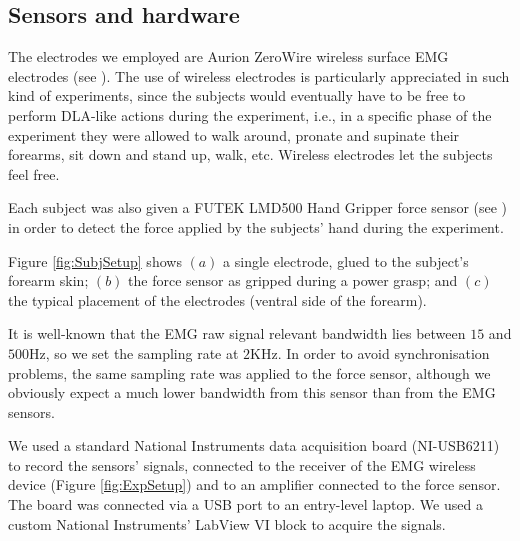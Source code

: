 \documentclass[10pt]{bmc_article}
\newenvironment{bmcformat}{\begin{raggedright}\baselineskip20pt\sloppy\setboolean{publ}{false}}{\end{raggedright}\baselineskip20pt\sloppy}
\begin{document}
\begin{bmcformat}
\subsection*{Sensors and hardware}


The electrodes we employed are Aurion ZeroWire wireless surface EMG
electrodes (see \cite{zerowire}). The use of wireless electrodes is
particularly appreciated in such kind of experiments, since the
subjects would eventually have to be free to perform DLA-like actions
during the experiment, i.e., in a specific phase of the experiment
they were allowed to walk around, pronate and supinate their forearms,
sit down and stand up, walk, etc. Wireless electrodes let the subjects
feel free.

Each subject was also given a FUTEK LMD500 Hand Gripper force sensor
(see \cite{LMD500}) in order to detect the force applied by the subjects'
hand during the experiment.

Figure \ref{fig:SubjSetup} shows $(a)$ a single electrode, glued to
the subject's forearm skin; $(b)$ the force sensor as gripped during a
power grasp; and $(c)$ the typical placement of the electrodes
(ventral side of the forearm).

It is well-known that the EMG raw signal relevant bandwidth lies
between $15$ and $500$Hz, so we set the sampling rate at $2$KHz. In
order to avoid synchronisation problems, the same sampling rate was
applied to the force sensor, although we obviously expect a much lower
bandwidth from this sensor than from the EMG sensors.

We used a standard National Instruments data acquisition board
(NI-USB6211) to record the sensors' signals, connected to the receiver
of the EMG wireless device (Figure \ref{fig:ExpSetup}) and to an
amplifier connected to the force sensor. The board was connected via a
USB port to an entry-level laptop. We used a custom National
Instruments' LabView VI block to acquire the signals.


\end{bmcformat}
\end{document}
